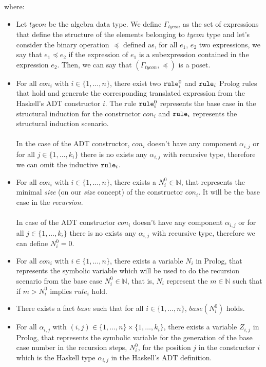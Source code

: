 where:
\begin{itemize}
	\item Let $tycon$ be the algebra data type. We define $\Gamma_{tycon}$ as the set of expressions that define the structure of the elements belonging to $tycon$ type and let's consider the binary operation $\preceq$ defined as, for all $e_1$, $e_2$ two expressions, we say that $e_1 \preceq e_2$ if the expression of $e_1$ is a subexpression contained in the expression $e_2$. Then, we can say that $(\Gamma_{tycon}, \preceq)$ is a poset.
	\item For all $con_i$ with $i \in \{1, \ldots, n \}$, there exist two $\texttt{rule}_{i}^{0}$ and $\texttt{rule}_i$ Prolog rules that hold and generate the corresponding translated expression from the Haskell's ADT constructor $i$. The rule $\texttt{rule}_{i}^{0}$ represents the base case in the structural induction for the constructor $con_i$ and $\texttt{rule}_i$ represents the structural induction scenario.\\\\
	      In the case of the ADT constructor, $con_i$ doesn't have any component $\alpha_{i,j}$ or for all $j \in \{1, \ldots, k_i \}$ there is no exists any $\alpha_{i,j}$ with recursive type, therefore we can omit the inductive $\texttt{rule}_i$.
	\item For all $con_i$ with $i \in \{1, \ldots, n \}$, there exists a $N_{i}^{0} \in \mathbb{N}$, that represents the minimal \textit{size} (on our \textit{size} concept) of the constructor $con_i$. It will be the base case in the \textit{recursion}.\\\\
	      In case of the ADT constructor $con_i$ doesn't have any component $\alpha_{i,j}$ or for all $j \in \{1, \ldots, k_i \}$ there is no exists any $\alpha_{i,j}$ with recursive type, therefore we can define $N_{i}^{0} = 0$.
	\item For all $con_i$ with $i \in \{1, \ldots, n \}$, there exists a variable $N_i$ in Prolog, that represents the symbolic variable which will be used to do the recursion scenario from the base case $N_{i}^{0} \in \mathbb{N}$, that is, $N_i$ represent the $m \in \mathbb{N}$ such that if $m > N_{i}^{0}$ implies $rule_i$ hold.
	\item There exists a fact $base$ such that for all $i \in \{1, \ldots, n \}$, $base(N_{i}^{0})$ holds.
	\item For all $\alpha_{i,j}$ with $(i,j) \in \{1, \ldots, n \} \times \{1, \ldots, k_i \}$, there exists a variable $Z_{i,j}$ in Prolog, that represents the symbolic variable for the generation of the base case number in the recursion steps, $N_{i}^{0}$, for the position $j$ in the constructor $i$ which is the Haskell type $\alpha_{i,j}$ in the Haskell's ADT definition.\\\\

\end{itemize}
